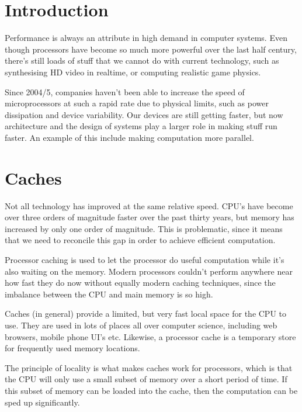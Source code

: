 
\section{Introduction}

Performance is always an attribute in high demand in computer systems. Even
though processors have become so much more powerful over the last half century,
there's still loads of stuff that we cannot do with current technology, such as
synthesising HD video in realtime, or computing realistic game physics.

Since 2004/5, companies haven't been able to increase the speed of
microprocessors at such a rapid rate due to physical limits, such as power
dissipation and device variability. Our devices are still getting faster, but
now architecture and the design of systems play a larger role in making stuff
run faster. An example of this include making computation more parallel.

\section{Caches}

Not all technology has improved at the same relative speed. CPU's have become
over three orders of magnitude faster over the past thirty years, but memory has
increased by only one order of magnitude. This is problematic, since it means
that we need to reconcile this gap in order to achieve efficient computation.

Processor caching is used to let the processor do useful computation while
it's also waiting on the memory. Modern processors couldn't perform anywhere
near how fast they do now without equally modern caching techniques, since the
imbalance between the CPU and main memory is so high.

Caches (in general) provide a limited, but very fast local space for the CPU to
use. They are used in lots of places all over computer science, including web
browsers, mobile phone UI's etc. Likewise, a processor cache is a temporary
store for frequently used memory locations.

The principle of locality is what makes caches work for processors, which is
that the CPU will only use a small subset of memory over a short period of time.
If this subset of memory can be loaded into the cache, then the computation can
be sped up significantly.

